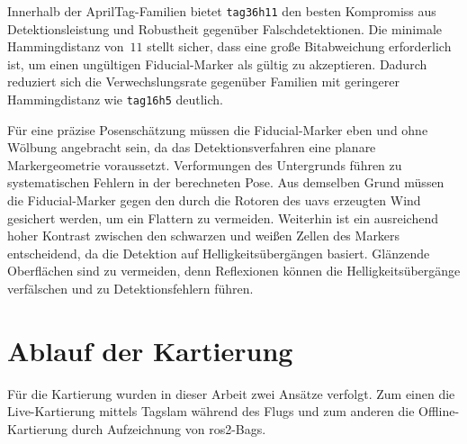 Innerhalb der AprilTag-Familien bietet \texttt{tag36h11} den besten Kompromiss
aus Detektionsleistung und Robustheit gegenüber Falschdetektionen.
Die minimale Hammingdistanz von~$11$ stellt sicher, dass eine große Bitabweichung erforderlich ist, um einen ungültigen Fiducial-Marker als gültig zu akzeptieren.
Dadurch reduziert sich die Verwechslungsrate gegenüber Familien mit geringerer Hammingdistanz wie \texttt{tag16h5} deutlich.~\cite{Olson5979561,rcvisard_tagdetect}

Für eine präzise Posenschätzung müssen die Fiducial-Marker eben und ohne Wölbung
angebracht sein, da das Detektionsverfahren eine planare Markergeometrie voraussetzt.
Verformungen des Untergrunds führen zu systematischen Fehlern in der berechneten Pose.
Aus demselben Grund müssen die Fiducial-Marker gegen den durch die Rotoren des \gls{uav}s erzeugten Wind gesichert werden, um ein Flattern zu vermeiden.
Weiterhin ist ein ausreichend hoher Kontrast zwischen den schwarzen und weißen
Zellen des Markers entscheidend, da die Detektion auf Helligkeitsübergängen basiert.
Glänzende Oberflächen sind zu vermeiden, denn Reflexionen können die Helligkeitsübergänge verfälschen und zu Detektionsfehlern führen.~\cite{Olson5979561,Kalaitzakis2021}






\section{Ablauf der Kartierung}
\label{sec:ablauf_kartierung}
Für die Kartierung wurden in dieser Arbeit zwei Ansätze verfolgt.
Zum einen die Live-Kartierung mittels Tag\gls{slam} während des Flugs und zum anderen die Offline-Kartierung durch Aufzeichnung von \gls{ros2}-Bags.

